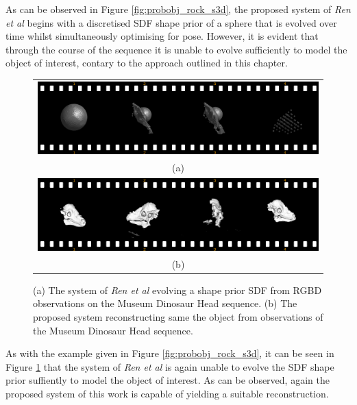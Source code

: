 As can be observed in Figure \ref{fig:probobj_rock_s3d}, the proposed system of 
\textit{Ren et al} begins with a discretised SDF shape prior of a sphere that is 
evolved over time whilst simultaneously optimising for pose. However, it is evident 
that through the course of the sequence it is unable to evolve sufficiently to model 
the object of interest, contary to the approach outlined in this chapter.

\begin{figure}[ht]
  \label{fig:probobj_dino_s3d}
  \centering
  \begin{tabular}{@{}c@{}}
    \includegraphics[width=.6\linewidth]{figures/object_recon/strips/dino_s3d.png} \\
    (a) \\
    \includegraphics[width=.6\linewidth]{figures/object_recon/strips/dino.png} \\ 
    (b) \\
  \end{tabular}
  \caption[Probabilistic Object Reconstruction Qualitative Results II]
  {(a) The system of \textit{Ren et al} \cite{Ren2013} evolving a shape prior SDF 
  from RGBD observations on the Museum Dinosaur Head sequence. (b) The proposed system 
  reconstructing same the object from observations of the Museum Dinosaur Head sequence.}
\end{figure}

As with the example given in Figure \ref{fig:probobj_rock_s3d}, it can be seen in 
Figure \ref{fig:probobj_dino_s3d} that the system of \textit{Ren et al} is again 
unable to evolve the SDF shape prior suffiently to model the object of interest. As 
can be observed, again the proposed system of this work is capable of yielding a suitable 
reconstruction.


